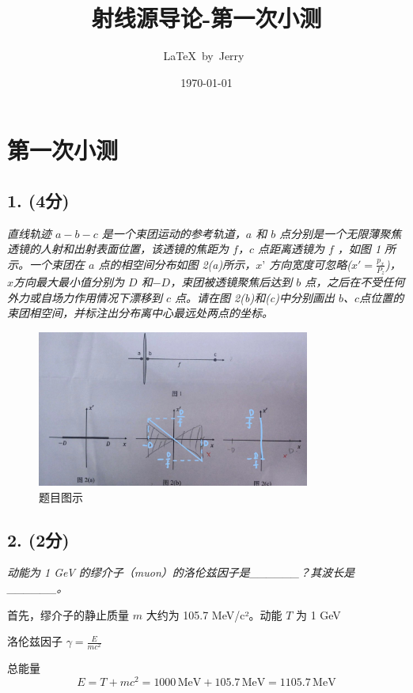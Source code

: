 \documentclass{article}
\title{射线源导论-第一次小测}
\author{\LaTeX\ by\ Jerry\ }
\date{\today}
\begin{document}
\pagestyle{fancy}

\fancyhead[R]{\today}

\section*{第一次小测}

\subsection*{1. (4分)}

\emph{直线轨迹 $a-b-c$ 是一个束团运动的参考轨道，$a$ 和 $b$ 点分别是一个无限薄聚焦透镜的人射和出射表面位置，该透镜的焦距为 $f$，$c$ 点距离透镜为 $f$ ，如图 1 所示。一个束团在 $a$ 点的相空间分布如图 2(a)所示，$x’$ 方向宽度可忽略($x'=\frac{p_x}{P_z}$)，$x$方向最大最小值分别为 $D$ 和$-D$，束团被透镜聚焦后达到 $b$ 点，之后在不受任何外力或自场力作用情况下漂移到 $c$ 点。请在图 2(b)和(c)中分别画出 $b$、$c$点位置的束团相空间，并标注出分布离中心最远处两点的坐标。}

\begin{figure}[htbp]
    \centering
    \includegraphics[width=0.8\textwidth]{./img/1.jpg}
    \caption{题目图示}
    \label{fig:1}
\end{figure}

\subsection*{2. (2分)}

\emph{动能为 1 GeV 的缪介子（muon）的洛伦兹因子是\_\_\_\_\_\_？其波长是\_\_\_\_\_\_。}

首先，缪介子的静止质量 $ m $ 大约为 105.7 MeV/c²。动能 $ T $ 为 1 GeV

洛伦兹因子 $\gamma = \frac{E}{m c^2}$

总能量 $$E = T + m c^2 = 1000 \, \text{MeV} + 105.7 \, \text{MeV} = 1105.7 \, \text{MeV}$$
\end{document}
